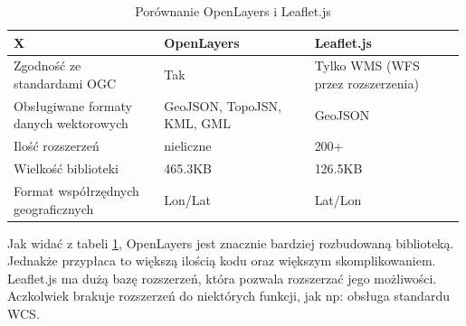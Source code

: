 \begin{table}[h!]
    \centering
    \begin{tabular}{|p{0.33\linewidth}|p{0.33\linewidth}|p{0.33\linewidth}|}
        \hline
        X & OpenLayers & Leaflet.js \\
		\hline
		Zgodność ze standardami OGC & Tak & Tylko WMS (WFS przez rozszerzenia) \\
		\hline
		Obsługiwane formaty danych wektorowych & GeoJSON, TopoJSN, KML, GML & GeoJSON \\
        \hline
        Ilość rozszerzeń & nieliczne & 200+ \\
		\hline
		Wielkość biblioteki & 465.3KB & 126.5KB \\
		\hline
		Format współrzędnych geograficznych & Lon/Lat & Lat/Lon \\
		\hline
    \end{tabular}
    \caption{Porównanie OpenLayers i Leaflet.js}
    \label{tab:porownanie_openlayers}
\end{table}

Jak widać z tabeli \ref{tab:porownanie_openlayers}, OpenLayers jest znacznie bardziej rozbudowaną biblioteką.
Jednakże przypłaca to większą ilością kodu oraz większym skomplikowaniem.
Leaflet.js ma dużą bazę rozszerzeń, która pozwala rozszerzać jego możliwości. Aczkolwiek brakuje rozszerzeń do niektórych funkcji,
jak np: obsługa standardu WCS.
